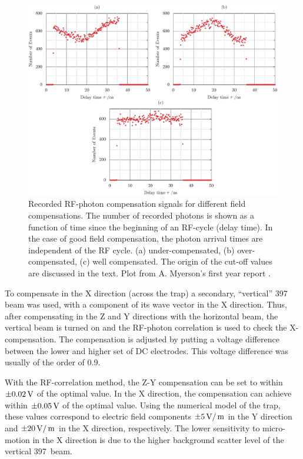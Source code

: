 \begin{figure}[t]
\centering
\includegraphics[width=14.5cm]{chapter6/rfcorr/rfexplots}
\caption[RF-photon compensation signals]{Recorded RF-photon compensation signals for different field compensations. The number of recorded photons is shown as a function of time since the beginning of an RF-cycle (delay time). In the case of good field compensation, the photon arrival times are independent of the RF cycle. (a) under-compensated, (b) over-compensated, (c) well compensated. The origin of the cut-off values are discussed in the text. Plot from A. Myerson's first year report \cite{Myerson2007}.}
\label{rfcorrelation}
\end{figure} 

To compensate in the X direction (across the trap) a secondary, ``vertical'' 397\nm\, beam was used, with a component of its wave vector in the X direction. Thus, after compensating in the Z and Y directions with the horizontal beam, the vertical beam is turned on and the RF-photon correlation is used to check the X-compensation. The compensation is adjusted by putting a voltage difference between the lower and higher set of DC electrodes. This voltage difference was usually of the order of 0.9\V. 

With the RF-correlation method, the Z-Y compensation can be set to within $\pm 0.02\,\mbox{V}$ of the optimal value. In the X direction, the compensation can achieve within $\pm 0.05\,\mbox{V}$ of the optimal value. Using the numerical model of the trap, these values correspond to electric field components $\pm 5\,\mbox{V}/\,\mbox{m}$ in the Y direction and $\pm 20\,\mbox{V}/\,\mbox{m}$ in the X direction, respectively. The lower sensitivity to micro-motion in the X direction is due to the higher background scatter level of the vertical 397\nm\, beam. 

